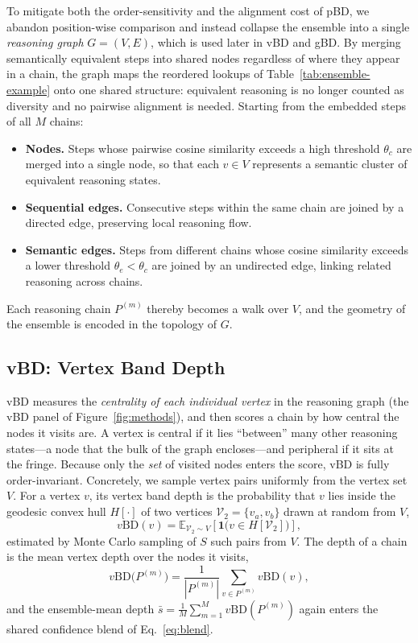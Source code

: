 \documentclass[twoside]{article}
\begin{document}
To mitigate both the order-sensitivity and the alignment cost of pBD, we abandon
position-wise comparison and instead collapse the ensemble into a single
\emph{reasoning graph} $G = (V, E)$, which is used later in vBD and gBD. By merging
semantically equivalent steps into shared nodes regardless of where they appear
in a chain, the graph maps the reordered lookups of
Table~\ref{tab:ensemble-example} onto one shared structure: equivalent reasoning
is no longer counted as diversity and no pairwise alignment is needed. Starting from the embedded steps of all $M$
chains:
\begin{itemize}
  \item \textbf{Nodes.} Steps whose pairwise cosine similarity exceeds a high
        threshold $\theta_c$ are merged into a single node, so that each
        $v \in V$ represents a semantic cluster of equivalent reasoning states.
  \item \textbf{Sequential edges.} Consecutive steps within the same chain are
        joined by a directed edge, preserving local reasoning flow.
  \item \textbf{Semantic edges.} Steps from different chains whose cosine
        similarity exceeds a lower threshold $\theta_e < \theta_c$ are joined by
        an undirected edge, linking related reasoning across chains.
\end{itemize}
Each reasoning chain $P^{(m)}$ thereby becomes a walk over $V$, and the geometry
of the ensemble is encoded in the topology of $G$.

\subsection{vBD: Vertex Band Depth}
\label{sec:method:vbd}

vBD measures the \emph{centrality of each individual vertex} in the reasoning
graph (the vBD panel of Figure~\ref{fig:methods}), and then scores a chain by how
central the nodes it visits are. A vertex is central if it lies ``between'' many other reasoning
states---a node that the bulk of the graph encloses---and peripheral if it sits
at the fringe. Because
only the \emph{set} of visited nodes enters the score, vBD is fully
order-invariant. Concretely, we sample vertex pairs uniformly from the vertex set $V$. For a
vertex $v$, its vertex band depth is the probability that $v$ lies inside the
geodesic convex hull $H[\cdot]$ of two vertices
$\mathcal{V}_2 = \{v_a, v_b\}$ drawn at random from $V$,
\begin{equation}
  v\text{BD}(v) = \mathbb{E}_{\mathcal{V}_2 \sim V}\!\left[ \mathbf{1}\big(v \in H[\mathcal{V}_2]\big) \right],
\end{equation}
estimated by Monte Carlo sampling of $S$ such pairs from $V$. The depth of a
chain is the mean vertex depth over the nodes it visits,
\begin{equation}
  v\text{BD}\big(P^{(m)}\big) = \frac{1}{|P^{(m)}|} \sum_{v \in P^{(m)}} v\text{BD}(v),
\end{equation}
and the ensemble-mean depth $\bar{s} = \frac{1}{M} \sum_{m=1}^{M} v\text{BD}(P^{(m)})$
again enters the shared confidence blend of Eq.~\eqref{eq:blend}.
\end{document}
